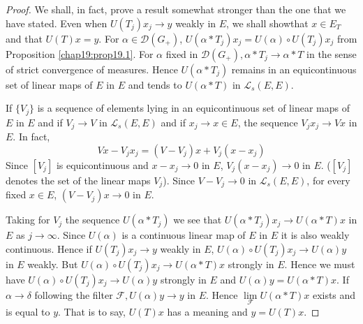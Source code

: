 \begin{proof}
We shall, in fact, prove a result somewhat stronger than the one that
we have stated. Even when $U(T_j)x_j\to y$ weakly in $E$, we shall
show\pageoriginale that $x\in E_T$ and that $U(T)x=y$. For $\alpha\in
\mathscr{D}(G_+)$, $U(\alpha *T_j)x_j=U(\alpha)\circ U(T_j)x_j$ from
Proposition \ref{chap19:prop19.1}. For $\alpha$ fixed in
$\mathscr{D}(G_+), \alpha * T_j\to\alpha *T$ in the sense of strict
convergence of measures. Hence $U(\alpha *T_j)$ remains in an
equicontinuous set of linear maps of $E$ in $E$ and tends to $U(\alpha
*T)$ in $\mathscr{L}_s(E, E)$.

If $\{V_j\}$ is a sequence of elements lying in an equicontinuous set
of linear maps of $E$ in $E$ and if $V_j\to V$ in $\mathscr{L}_s(E,
E)$ and if $x_j\to x\in E$, the sequence $V_jx_j\to Vx$ in $E$. In
fact,
$$
Vx-V_jx_j=(V-V_j)x+V_j(x-x_j)
$$
Since $[V_j]$ is equicontinuous and $x-x_j\to 0$ in $E$, $V_j(x-x_j)
\to 0$ in $E$. ($[V_j]$ denotes the set of the linear maps
$V_j$). Since $V-V_j\to 0$ in $\mathscr{L}_s(E,E)$, for every fixed
$x\in E$, $(V-V_j)x\to 0$ in $E$.

Taking for $V_j$ the sequence $U(\alpha *T_j)$ we see that $U(\alpha *
T_j)x_j\to U(\alpha *T)x$ in $E$ as $j\to\infty$. Since $U(\alpha)$ is
a continuous linear map of $E$ in $E$ it is also weakly
continuous. Hence if $U(T_j)x_j\to y$ weakly in $E$, $U(\alpha)\circ U
(T_j)x_j\to U(\alpha)y$ in $E$ weakly. But $U(\alpha)\circ U(T_j)x_j
\to U(\alpha *T)x$ strongly in $E$. Hence we must have $U(\alpha)\circ
U(T_j)x_j\to U(\alpha)y$ strongly in $E$ and $U(\alpha)y=U(\alpha
*T)x$. If $\alpha\to\delta$ following the filter
$\mathscr{F},U(\alpha)y \to y$ in $E$. Hence
$\lim\limits_{\mathscr{F}} U(\alpha * T)x$ exists and is equal to
$y$. That is to say, $U(T)x$ has a meaning and $y=U(T)x$. 
\end{proof}

